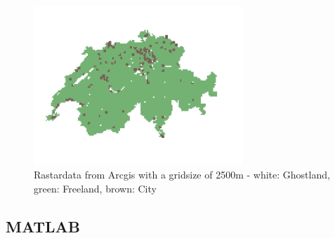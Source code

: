 \documentclass[11pt]{scrartcl}
\begin{document}
\begin{figure}[H]
	\centering
	\includegraphics[width=0.7\textwidth]{figures/map_2500_cities}
	\caption{Rastardata from Arcgis with a gridsize of 2500m - white: Ghostland, green: Freeland, brown: City}
	\label{fig:map_cities}
\end{figure}


\subsection{MATLAB}
\end{document}
